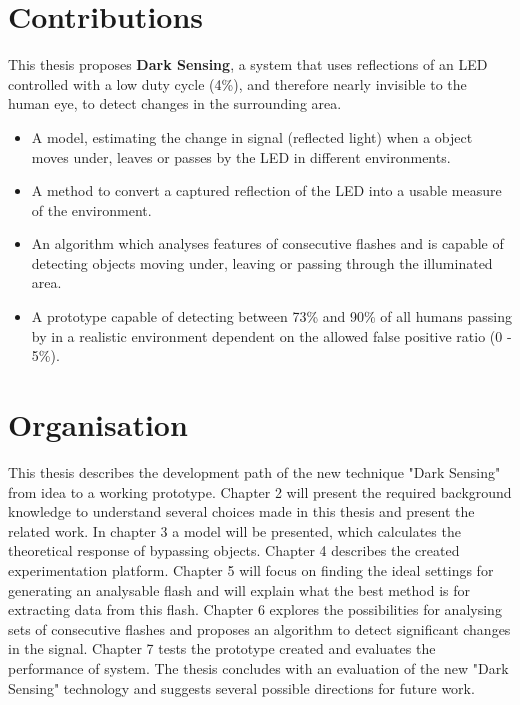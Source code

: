 \section{Contributions}
\label{sec:Contributions}
This thesis proposes \textbf{Dark Sensing}, a system that uses reflections of an LED controlled with a low duty cycle (4\%), and therefore nearly invisible to the human eye, to detect changes in the surrounding area.
\begin{itemize}\itemsep2pt
	\item A model, estimating the change in signal (reflected light) when a object moves under, leaves or passes by the LED in different environments.
	\item A method to convert a captured reflection of the LED into a usable measure of the environment.
	\item An algorithm which analyses features of consecutive flashes and is capable of detecting objects moving under, leaving or passing through the illuminated area.
	\item A prototype capable of detecting between 73\% and 90\% of all humans passing by in a realistic environment dependent on the allowed false positive ratio (0 - 5\%).
\end{itemize}

\section{Organisation}
This thesis describes the development path of the new technique "Dark Sensing" from idea to a working prototype. Chapter 2 will present the required background knowledge to understand several choices made in this thesis and present the related work. In chapter 3 a model will be presented, which calculates the theoretical response of bypassing objects. Chapter 4 describes the created experimentation platform. Chapter 5 will focus on finding the ideal settings for generating an analysable flash and will explain what the best method is for extracting data from this flash. Chapter 6 explores the possibilities for analysing sets of consecutive flashes and proposes an algorithm to detect significant changes in the signal. Chapter 7 tests the prototype created and evaluates the performance of system. The thesis concludes with an evaluation of the new "Dark Sensing" technology and suggests several possible directions for future work.